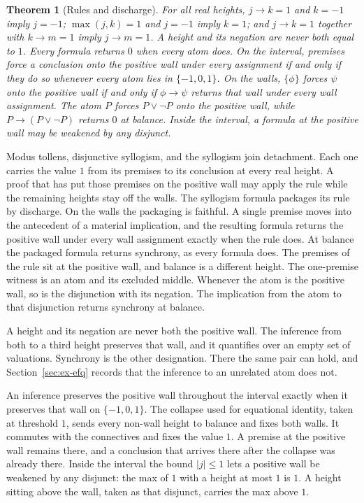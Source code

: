 \documentclass[a4paper]{article}
\newtheorem{theorem}{Theorem}[section]
\theoremstyle{definition}
\begin{document}
\begin{theorem}[Rules and discharge]
\label{thm:rules}
For all real heights, \(j\to k=1\) and \(k=-1\) imply \(j=-1\);
\(\max(j,k)=1\) and \(j=-1\) imply \(k=1\); and \(j\to k=1\) together
with \(k\to m=1\) imply \(j\to m=1\). A height and its negation are
never both equal to \(1\). Every formula returns \(0\) when every atom
does. On the interval, premises force a conclusion onto the positive
wall under every assignment if and only if they do so whenever every
atom lies in \(\{-1,0,1\}\). On the walls, \(\{\phi\}\) forces \(\psi\)
onto the positive wall if and only if \(\phi\to\psi\) returns that wall
under every wall assignment. The atom \(P\) forces \(P\vee\neg P\) onto
the positive wall, while \(P\to(P\vee\neg P)\) returns \(0\) at balance.
Inside the interval, a formula at the positive wall may be weakened by
any disjunct.
\end{theorem}

Modus tollens, disjunctive syllogism, and the syllogism join detachment.
Each one carries the value \(1\) from its premises to its conclusion
at every real height. A proof that has put those premises on the
positive wall may apply the rule while the remaining heights stay off
the walls.
The syllogism formula packages its rule by discharge. On the walls the
packaging is faithful. A single premise moves into the antecedent of a
material implication, and the resulting formula returns the positive
wall under every wall assignment exactly when the rule does. At balance
the packaged formula returns synchrony, as every formula does. The
premises of the rule sit at the positive wall, and balance is a
different height. The one-premise witness is an atom and its excluded
middle. Whenever the atom is the positive wall, so is the disjunction
with its negation. The implication from the atom to that disjunction
returns synchrony at balance.

A height and its negation are never both the positive wall. The
inference from both to a third height preserves that wall, and it
quantifies over an empty set of valuations. Synchrony is the other
designation. There the same pair can hold, and Section~\ref{sec:ex-efq}
records that the inference to an unrelated atom does not.

An inference preserves the positive wall throughout the interval
exactly when it preserves that wall on \(\{-1,0,1\}\). The collapse
used for equational identity, taken at threshold \(1\), sends every
non-wall height to balance and fixes both walls. It commutes with the
connectives and fixes the value \(1\). A premise at the positive wall
remains there, and a conclusion that arrives there after the collapse
was already there. Inside the interval the bound \(|j|\le 1\) lets a
positive wall be weakened by any disjunct: the max of \(1\) with a
height at most \(1\) is \(1\). A height sitting above the wall, taken
as that disjunct, carries the max above \(1\).
\end{document}
